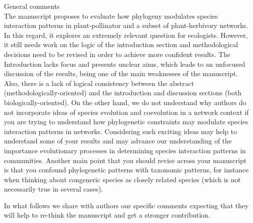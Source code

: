\documentclass[12pt]{letter}
\newenvironment{refquote}{\bigskip \begin{it}}{\end{it}\smallskip}
\begin{document}
	\begin{refquote}
	General comments\\

	The manuscript proposes to evaluate how phylogeny modulates species interaction patterns in plant-pollinator and a subset of plant-herbivory networks. In this regard, it explores an extremely relevant question for ecologists. However, it still needs work on the logic of the introduction section and methodological decisions need to be revised in order to achieve more confident results. The Introduction lacks focus and presents unclear aims, which leads to an unfocused discussion of the results, being one of the main weaknesses of the manuscript. Also, there is a lack of logical consistency between the abstract (methodologically-oriented) and the introduction and discussion sections (both biologically-oriented). On the other hand, we do not understand why authors do not incorporate ideas of species evolution and coevolution in a network context if you are trying to understand how phylogenetic constraints may modulate species interaction patterns in networks. Considering such exciting ideas may help to understand some of your results and may advance our understanding of  the importance evolutionary processes in determining species interaction patterns in communities.
	Another main point that you should revise across your manuscript is that you confound phylogenetic patterns with taxonomic patterns, for instance when thinking about congeneric species as closely related species (which is not necessarily true in several cases).

	\smallskip

	In what follows we share with authors our specific comments expecting that they will help to re-think the manuscript and get a stronger contribution.

	\end{refquote}
\end{document}
